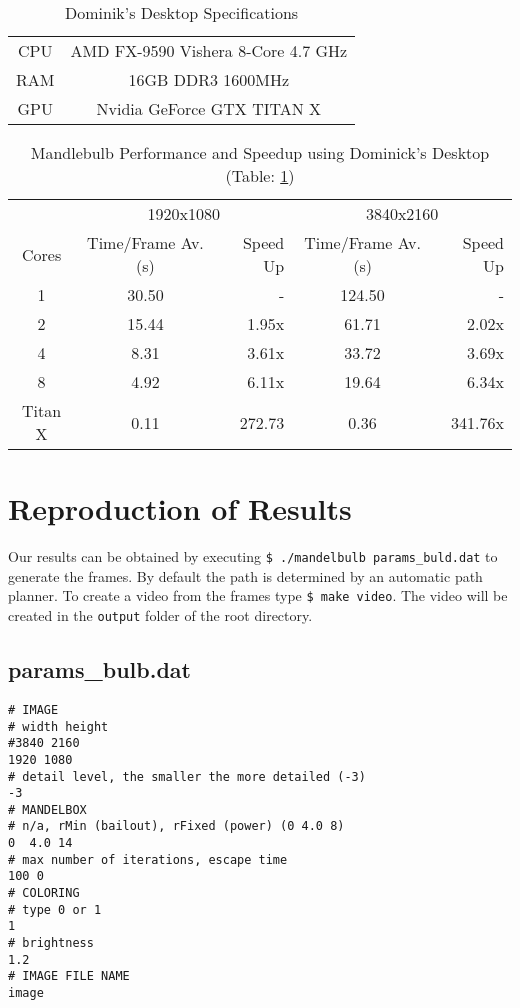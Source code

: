 \documentclass[]{article}
\begin{document}
\vspace{0.125cm}

\begin{table}[h!]
\centering
\label{tab:dd_spec}
\begin{tabular}{c|c}
CPU & AMD FX-9590 Vishera 8-Core 4.7 GHz\\
RAM & 16GB DDR3 1600MHz\\
GPU & Nvidia GeForce GTX TITAN X\\
\end{tabular}
\caption{Dominik's Desktop Specifications}
\end{table}

\begin{table}[h!]
\centering
\begin{tabular}{|c|c|r|c|r|} \hline
& \multicolumn{2}{c|}{1920x1080} & \multicolumn{2}{c|}{3840x2160} \\ \cline{2-5}
Cores & Time/Frame Av. (s)  & Speed Up & Time/Frame Av. (s) & Speed Up \\ 
\hline
1 & 30.50 & - & 124.50 & -\\
2 & 15.44 & 1.95x & 61.71  & 2.02x \\
4 & 8.31  & 3.61x & 33.72  & 3.69x\\
8 & 4.92  & 6.11x & 19.64  & 6.34x\\ 
\hline
Titan X & 0.11 & 272.73 & 0.36 & 341.76x\\ \hline
\end{tabular}
\caption{Mandlebulb Performance and Speedup using Dominick's Desktop (Table: \ref{tab:dd_spec}) }
\end{table}

\section*{Reproduction of Results}
Our results can be obtained by executing \texttt{\$ ./mandelbulb params\_buld.dat} to generate the frames. By default the path is determined by an automatic path planner. To create a video from the frames type \texttt{\$ make video}. The video will be created in the \texttt{output} folder of the root directory.  
\subsection*{params\_bulb.dat}\label{subsec:params_bulb}
\begin{Verbatim}[fontsize= \footnotesize, tabsize=4]
# IMAGE
# width height
#3840 2160
1920 1080
# detail level, the smaller the more detailed (-3)
-3
# MANDELBOX
# n/a, rMin (bailout), rFixed (power) (0 4.0 8)
0  4.0 14
# max number of iterations, escape time
100 0
# COLORING
# type 0 or 1
1
# brightness
1.2
# IMAGE FILE NAME
image
\end{Verbatim}
\end{document}

